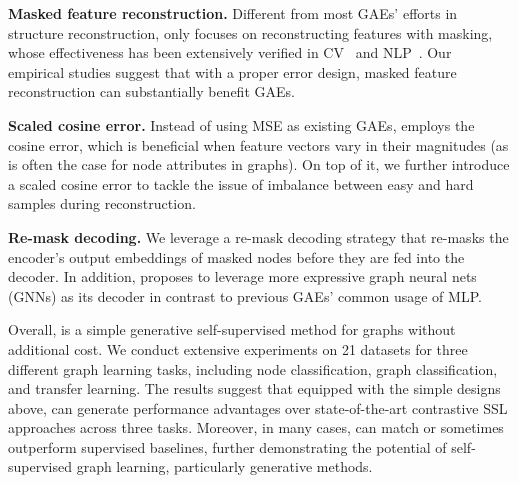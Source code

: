 \textbf{Masked feature reconstruction.}
Different from most GAEs' efforts in structure reconstruction, \model only focuses on reconstructing features with masking, whose effectiveness has been extensively verified in CV~\cite{he2021masked} and  NLP~\cite{devlin2019bert,Radford2019LanguageMA}.
Our empirical studies suggest that with a proper error design, masked feature reconstruction can  substantially benefit GAEs. 



\textbf{Scaled cosine error.}
Instead of using MSE as existing GAEs, \model employs the cosine error,  which is beneficial when feature vectors vary in their magnitudes (as is often the case for node attributes in graphs). 
On top of it, we further introduce a scaled cosine error to tackle the issue of imbalance between easy and hard samples during reconstruction.

\textbf{Re-mask decoding.}
We leverage a re-mask decoding strategy that re-masks the encoder's output embeddings of masked nodes 
before they are fed into the decoder. 
In addition,  \model proposes to leverage more expressive graph neural nets (GNNs) as its decoder in contrast to previous GAEs' common usage of MLP. 




Overall, \model is a simple generative self-supervised  method for graphs without additional cost. 
We conduct extensive experiments on 21 datasets for three different graph learning tasks, including node classification, graph classification, and transfer learning.
The results suggest that equipped with the simple designs above, \model can generate performance advantages over state-of-the-art contrastive SSL approaches across three tasks. 
Moreover, in many cases, \model can match or sometimes outperform supervised baselines, further demonstrating the potential of self-supervised graph learning, particularly generative methods. 






